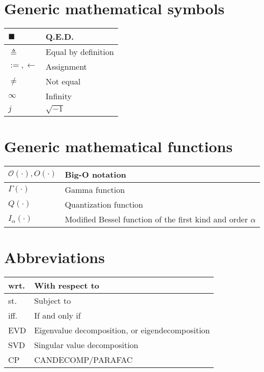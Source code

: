 \documentclass{article}
\begin{document}
\section{Generic mathematical symbols}
\begin{xltabular}{\textwidth}{XX}
    \(\blacksquare\) & Q.E.D. \\ \hline
    \(\triangleq\) & Equal by definition\\ \hline
    \(:=, \leftarrow\) & Assignment \cite{rosenDiscreteMathematicsIts2011}\\ \hline
    \(\neq\) & Not equal\\ \hline
    \(\infty\) & Infinity\\ \hline
    \(j\) & \(\sqrt{-1}\)\\
\end{xltabular}

\section{Generic mathematical functions}
\begin{xltabular}{\textwidth}{XX}
    \(\mathcal{O}(\cdot), O(\cdot)\) & Big-O notation\\ \hline
    \(\Gamma(\cdot)\) & Gamma function\\ \hline
    \(Q(\cdot)\) & Quantization function\\ \hline
    \(I_\alpha(\cdot)\) & Modified Bessel function of the first kind and order \(\alpha\)
\end{xltabular}

\section{Abbreviations}
\begin{xltabular}{\textwidth}{XX}
    wrt. & With respect to\\ \hline
    st. & Subject to\\ \hline
    iff. & If and only if\\ \hline
    EVD & Eigenvalue decomposition, or eigendecomposition \cite{nossekAdaptiveArraySignal2015}\\ \hline
    SVD & Singular value decomposition\\ \hline
    CP & CANDECOMP/PARAFAC\\
\end{xltabular}

\printbibliography
\end{document}

